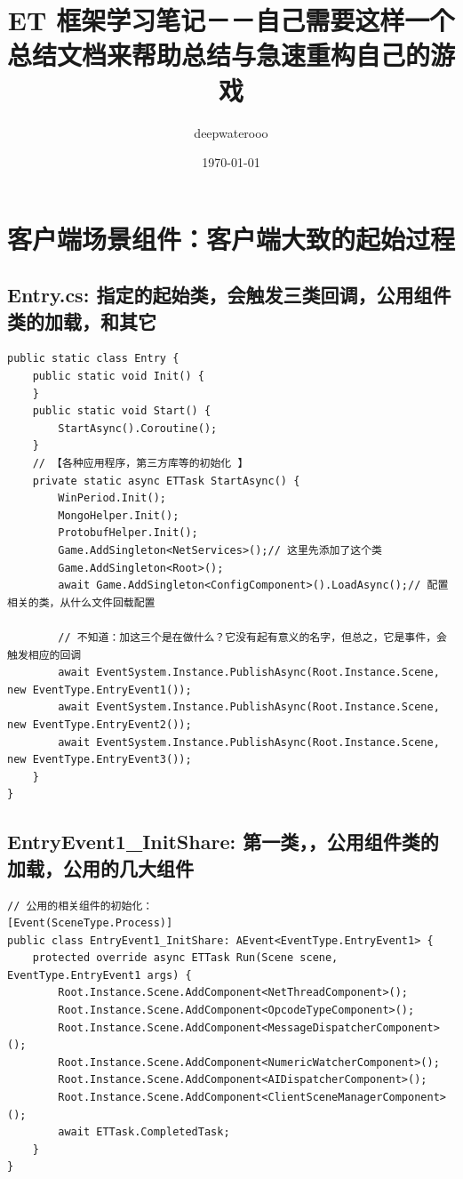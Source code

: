 \documentclass[9pt, b5paper]{article}
\author{deepwaterooo}
\date{\today}
\title{ET 框架学习笔记－－自己需要这样一个总结文档来帮助总结与急速重构自己的游戏}
\begin{document}
\maketitle
\tableofcontents

\section{客户端场景组件：客户端大致的起始过程}
\label{sec-1}
\subsection{Entry.cs: 指定的起始类，会触发三类回调，公用组件类的加载，和其它}
\label{sec-1-1}
\begin{verbatim}
public static class Entry {
    public static void Init() {
    }
    public static void Start() {
        StartAsync().Coroutine();
    }
    // 【各种应用程序，第三方库等的初始化 】
    private static async ETTask StartAsync() {
        WinPeriod.Init();
        MongoHelper.Init();
        ProtobufHelper.Init();
        Game.AddSingleton<NetServices>();// 这里先添加了这个类
        Game.AddSingleton<Root>();
        await Game.AddSingleton<ConfigComponent>().LoadAsync();// 配置相关的类，从什么文件回载配置 

        // 不知道：加这三个是在做什么？它没有起有意义的名字，但总之，它是事件，会触发相应的回调
        await EventSystem.Instance.PublishAsync(Root.Instance.Scene, new EventType.EntryEvent1());
        await EventSystem.Instance.PublishAsync(Root.Instance.Scene, new EventType.EntryEvent2());
        await EventSystem.Instance.PublishAsync(Root.Instance.Scene, new EventType.EntryEvent3());
    }
}
\end{verbatim}
\subsection{EntryEvent1\_InitShare: 第一类，，公用组件类的加载，公用的几大组件}
\label{sec-1-2}
\begin{verbatim}
// 公用的相关组件的初始化：
[Event(SceneType.Process)]
public class EntryEvent1_InitShare: AEvent<EventType.EntryEvent1> {
    protected override async ETTask Run(Scene scene, EventType.EntryEvent1 args) {
        Root.Instance.Scene.AddComponent<NetThreadComponent>();
        Root.Instance.Scene.AddComponent<OpcodeTypeComponent>();
        Root.Instance.Scene.AddComponent<MessageDispatcherComponent>();
        Root.Instance.Scene.AddComponent<NumericWatcherComponent>();
        Root.Instance.Scene.AddComponent<AIDispatcherComponent>();
        Root.Instance.Scene.AddComponent<ClientSceneManagerComponent>();
        await ETTask.CompletedTask;
    }
}
\end{verbatim}
\end{document}
